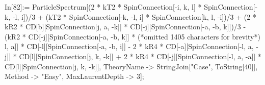In[82]:= ParticleSpectrum[(2 * kT2 * SpinConnection[-i, k, l] * SpinConnection[-k, -l, i])/3 + (kT2 * SpinConnection[-k, -l, i] * SpinConnection[k, l, -i])/3 + (2 * kR2 * CD[b][SpinConnection[j, a, -k]] * CD[-j][SpinConnection[-a, -b, k]])/3 - (kR2 * CD[-j][SpinConnection[-a, -b, k]] * (*omitted 1405 characters for brevity*) l, a]] * CD[-l][SpinConnection[-a, -b, i]] - 2 * kR4 * CD[-a][SpinConnection[-l, a, -j]] * CD[l][SpinConnection[j, k, -k]] + 2 * kR4 * CD[-j][SpinConnection[-l, a, -a]] * CD[l][SpinConnection[j, k, -k]], TheoryName -> StringJoin["Case", ToString[40]], Method -> "Easy", MaxLaurentDepth -> 3];